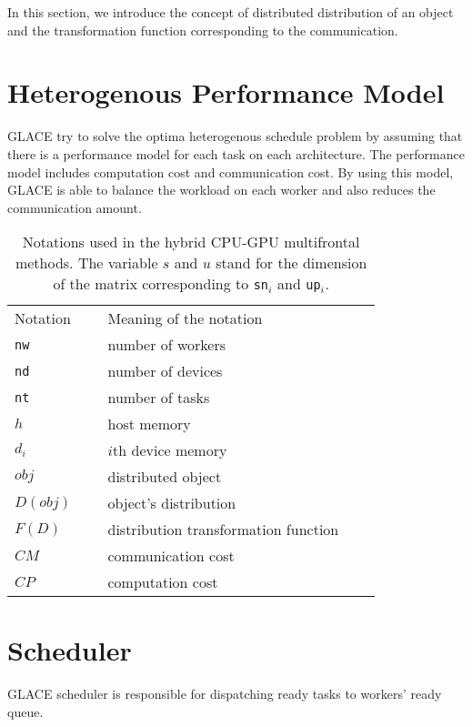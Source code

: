 \documentclass[preprint,11pt]{elsarticle}
\begin{document}
  In this section, we introduce the concept of distributed distribution of an object and the 
  transformation function corresponding to the communication. 
   
    
\section{Heterogenous Performance Model}
  GLACE try to solve the optima heterogenous schedule problem by assuming that there is 
  a performance model for each task on each architecture. The performance model includes
  computation cost and communication cost. By using this model, GLACE is able to balance
  the workload on each worker and also reduces the communication amount.  

\begin{table}
  \centering
  {\footnotesize 
  \begin{tabular}{lllll}
    \hline
    Notation    &\ & Meaning of the notation \\  \cline{1-1}  \cline{3-3}
    {\tt nw}        && number of workers \\
    {\tt nd}         && number of devices \\
    {\tt nt}          && number of tasks \\
    \hline
    {\tt $h$}       && host memory \\
    {\tt $d_i$}    && $i$th device memory \\
    {\tt $obj$}    && distributed object \\
    \hline
    $D(obj)$      && object's distribution \\
    $F(D)$        && distribution transformation function \\
    \hline
    $CM$          && communication cost \\
    $CP$           && computation cost \\
    \hline
  \end{tabular}
}
\caption{Notations used in the hybrid CPU-GPU multifrontal methods.
  The variable $s$ and $u$ stand for the dimension of the matrix corresponding 
  to {\tt sn$_i$} and {\tt up$_i$}.}
  \label{tab:notation}
\end{table}

\section{Scheduler}
  GLACE scheduler is responsible for dispatching ready tasks to workers' ready queue. 
\end{document}
